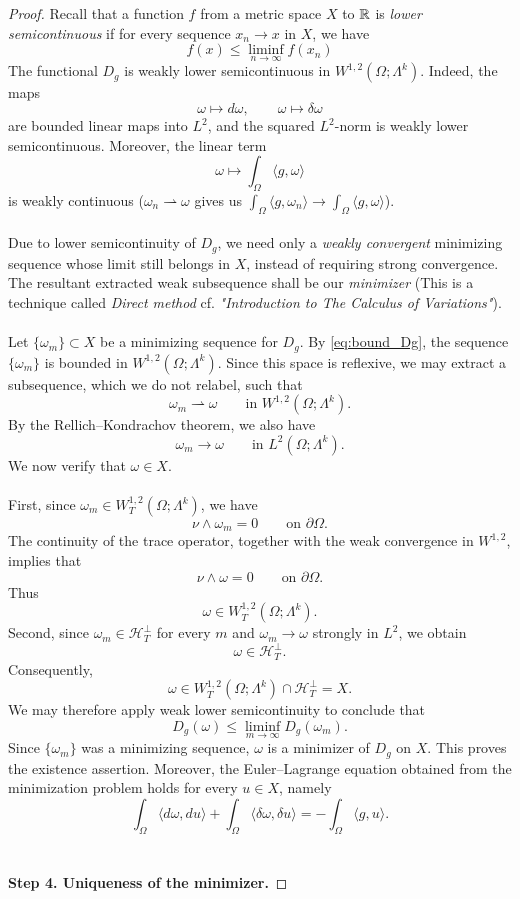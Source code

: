 \begin{proof}
Recall that a function $f$ from a metric space $X$ to $\mathbb{R}$ is \emph{lower semicontinuous} if for every sequence $x_n\to x \text{ in }X$, we have $$f(x)\leq \liminf_{n\to \infty} f(x_n) $$
The functional $D_g$ is weakly lower semicontinuous in
$W^{1,2}(\Omega;\Lambda^k)$. Indeed, the maps
\[
    \omega\longmapsto d\omega,
    \qquad
    \omega\longmapsto\delta\omega
\]
are bounded linear maps into $L^2$, and the squared $L^2$-norm is
weakly lower semicontinuous. Moreover, the linear term
\[
    \omega\longmapsto\int_\Omega\langle g,\omega\rangle
\]
is weakly continuous ($\omega_n\rightharpoonup \omega$ gives us $ \int_{\Omega}\langle g,\omega_n\rangle \to \int_{\Omega}\langle g,\omega\rangle$).
\\\\ Due to lower semicontinuity of $D_g$, we need only a \emph{weakly convergent} minimizing sequence whose limit still belongs in $X$, instead of requiring strong convergence. The resultant extracted weak subsequence shall be our \emph{minimizer} (This is a technique called \emph{Direct method} cf. \cite{Dacorogna2008} \emph{"Introduction to The Calculus of Variations"}). 
\\\\ Let $\{\omega_m\}\subset X$ be a minimizing sequence for $D_g$. By
\eqref{eq:bound_Dg}, the sequence $\{\omega_m\}$ is bounded in
$W^{1,2}(\Omega;\Lambda^k)$. Since this space is reflexive, we may
extract a subsequence, which we do not relabel, such that
\[
    \omega_m\rightharpoonup\omega
    \qquad\text{in }W^{1,2}(\Omega;\Lambda^k).
\]
By the Rellich--Kondrachov theorem, we also have
\[
    \omega_m\longrightarrow\omega
    \qquad\text{in }L^2(\Omega;\Lambda^k).
\]
We now verify that $\omega\in X$.
\\\\ First, since $\omega_m\in W_T^{1,2}(\Omega;\Lambda^k)$, we have
\[
    \nu\wedge\omega_m=0
    \qquad\text{on }\partial\Omega.
\]
The continuity of the trace operator, together with the weak
convergence in $W^{1,2}$, implies that
\[
    \nu\wedge\omega=0
    \qquad\text{on }\partial\Omega.
\]
Thus
\[
    \omega\in W_T^{1,2}(\Omega;\Lambda^k).
\]
Second, since $\omega_m\in\mathcal H_T^\perp$ for every $m$ and
$\omega_m\to\omega$ strongly in $L^2$, we obtain
\[
    \omega\in\mathcal H_T^\perp.
\]
Consequently,
\[
    \omega\in W_T^{1,2}(\Omega;\Lambda^k)
    \cap\mathcal H_T^\perp=X.
\]
We may therefore apply weak lower semicontinuity to conclude that
\[
    D_g(\omega)
    \leq\liminf_{m\to\infty}D_g(\omega_m).
\]
Since $\{\omega_m\}$ was a minimizing sequence, $\omega$ is a minimizer
of $D_g$ on $X$. This proves the existence assertion. Moreover, the Euler--Lagrange equation obtained from the minimization
problem holds for every $u\in X$, namely
\begin{equation}\label{eq:EL_X}
    \int_\Omega\langle d\omega,du\rangle
    +\int_\Omega\langle\delta\omega,\delta u\rangle
    =
    -\int_\Omega\langle g,u\rangle.
\end{equation}
\\\\ \textbf{Step 4. Uniqueness of the minimizer.}


\end{proof}

